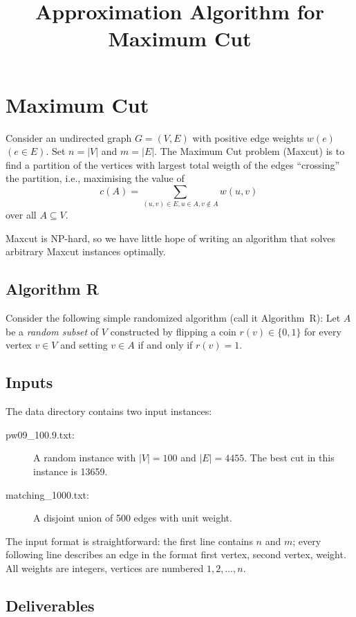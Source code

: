 \documentclass{tufte-handout}
\title{\sf Approximation Algorithm for Maximum Cut}
\begin{document}
\maketitle
{}

\section{Maximum Cut}
Consider an undirected graph $G=(V,E)$ with positive edge weights
$w(e)$ $(e\in E)$.
Set $n=|V|$ and $m=|E|$.
The Maximum Cut problem (Maxcut) is to find a partition of the
vertices with largest total weigth of the edges ``crossing'' the
partition, i.e., maximising the value of \[c(A)= \sum_{(u,v)\in E,
  u\in A, v\notin A} w(u,v)\,\] over all $A\subseteq V$.

Maxcut is NP-hard, so we have little hope of writing an algorithm that
solves arbitrary Maxcut instances optimally.

\subsection{ Algorithm R}

Consider the following simple randomized algorithm (call it
Algorithm~R): Let $A$ be a \emph{random subset} of $V$ constructed by
flipping a coin $r(v)\in\{0,1\}$ for every vertex $v\in V$ and setting
$v\in A$ if and only if $r(v)=1$.

\subsection{ Inputs}

The  data directory contains two input instances:
\begin{description}
\item[ pw09\_100.9.txt:] A random instance with $|V|=100$ and
  $|E|=4455$. The best cut in this instance is
  13659.
\item[ matching\_1000.txt:] A disjoint union of 500 edges with unit weight.
\end{description}

The input format is straightforward: the first line contains $n$ and
$m$; every following line describes an edge in the format first
vertex, second vertex, weight.
All weights are integers, vertices are numbered $1,2,\ldots, n$.

\subsection{ Deliverables}
\end{document}
